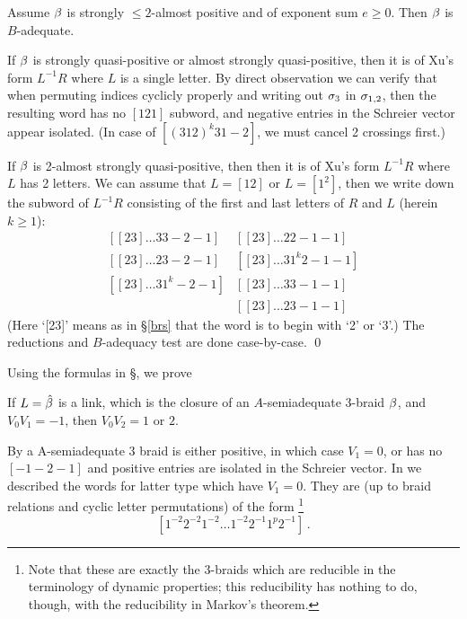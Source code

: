 \begin{lemma}\label{oia}
Assume $\beta$ is strongly $\le 2$-almost positive and of exponent 
sum $e\ge 0$. Then $\beta$ is $B$-adequate.
\end{lemma}

\proof
If $\beta$ is strongly quasi-positive or almost strongly
quasi-positive, then it is of Xu's form $L^{-1}R$
where $L$ is a single letter. By direct observation
we can verify that when permuting indices cyclicly
properly and writing out $\sigma_3$ in $\sigma_{1,2}$, then
the resulting word has no $[121]$ subword, and negative
entries in the Schreier vector appear isolated. (In case
of $[(312)^k31-2]$, we must cancel 2 crossings first.)

If $\beta$ is 2-almost strongly quasi-positive, then then
it is of Xu's form $L^{-1}R$ where $L$ has 2 letters.
We can assume that $L=[12]$ or $L=[1^2]$, then we write down
the subword of $L^{-1}R$ consisting of the first and last
letters of $R$ and $L$ (herein $k\ge 1$):
\[
\begin{array}{ll}
[[23] \dots 33-2-1] & [[23] \dots 22-1-1] \\{}
[[23] \dots 23-2-1] & [[23] \dots 31^k2-1-1] \\{}
[[23] \dots 31^k-2-1] & [[23] \dots 33-1-1] \\{}
& [[23] \dots 23-1-1]
\end{array}
\]
(Here `[23]' means as in \S\ref{brs} that the word is to begin with
`2' or `3'.) The reductions and $B$-adequacy test are done
case-by-case. \qed

Using the formulas in \S{}, we prove

\begin{lemma}\label{yu}
If $L=\hat{\beta}$ is a link, which is the closure of an $A$-semiadequate 
$3$-braid $\beta$, and $V_0V_1=-1$, then $V_0V_2=1$ or $2$.
\end{lemma}

\proof By \cite{ntriv} a A-semiadequate $3$ braid is either
positive, in which case $V_1=0$, or has no $[-1-2-1]$ and
positive entries are isolated in the Schreier vector.
In \cite{ntriv} we described the words  for latter
type which have $V_1=0$. They are (up to braid relations
and cyclic letter permutations) of the form%
\footnote{Note that these are exactly the 3-braids which are
reducible in the terminology of dynamic properties;
this reducibility has nothing to do, though, with the
reducibility in Markov's theorem.}
\[
[1^{-2}2^{-2}1^{-2}\dots 1^{-2}2^{-1}1^p2^{-1}]\,.
\]

